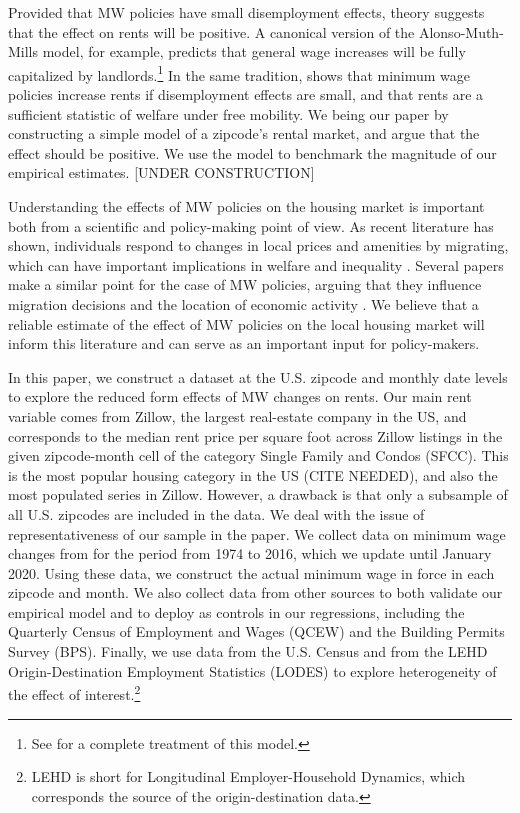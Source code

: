 Provided that MW policies have small disemployment effects, theory suggests that the effect 
on rents will be positive. A canonical version of the Alonso-Muth-Mills model, for example, 
predicts that general wage increases will be fully capitalized by landlords.\footnote{See 
	\textcite{Brueckner1987} for a complete treatment of this model.} 
In the same tradition, \textcite{Yamagishi2020} shows that minimum wage policies increase 
rents if disemployment effects are small, and that rents are a sufficient statistic of welfare 
under free mobility. We being our paper by constructing a simple model of a zipcode's rental 
market, and argue that the effect should be positive. We use the model to benchmark the 
magnitude of our empirical estimates. [UNDER CONSTRUCTION] 
 
Understanding the effects of MW policies on the housing market is important both from a 
scientific and policy-making point of view. As recent literature has shown, individuals 
respond to changes in local prices and amenities by migrating, which can have important 
implications in welfare and inequality \parencite{Diamond2016, Couture2019}. Several papers 
make a similar point for the case of MW policies, arguing that they influence migration 
decisions and the location of economic activity \parencite{PerezPerez2018, Monras2019}. We 
believe that a reliable estimate of the effect of MW policies on the local housing market 
will inform this literature and can serve as an important input for policy-makers.
 
In this paper, we construct a dataset at the U.S. zipcode and monthly date levels to explore 
the reduced form effects of MW changes on rents. Our main rent variable comes from Zillow, 
the largest real-estate company in the US, and corresponds to the median rent price per square 
foot across Zillow listings in the given zipcode-month cell of the category Single Family and 
Condos (SFCC). This is the most popular housing category in the US (CITE NEEDED), and also 
the most populated series in Zillow. However, a drawback is that only a subsample of all U.S. 
zipcodes are included in the data. We deal with the issue of representativeness of our sample 
in the paper. We collect data on minimum wage changes from \textcite{VaghulZipperer2016} for 
the period from 1974 to 2016, which we update until January 2020. Using these data, we 
construct the actual minimum wage in force in each zipcode and month. We also collect data 
from other sources to both validate our empirical model and to deploy as controls in our 
regressions, including the Quarterly Census of Employment and Wages (QCEW) and the Building 
Permits Survey (BPS). Finally, we use data from the U.S. Census and from the  LEHD 
Origin-Destination Employment Statistics (LODES) to explore heterogeneity of the effect of 
interest.\footnote{LEHD is short for Longitudinal Employer-Household Dynamics, which corresponds 
	the source of the origin-destination data.}

